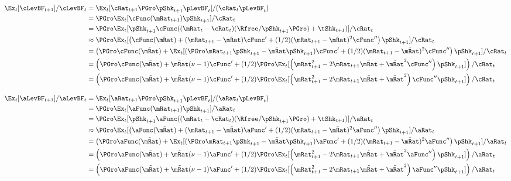 \documentclass[\econtexRoot/BufferStockTheory]{subfiles}
\begin{document}
  
\begin{align*}
\Ex_{t}[\cLevBF_{t+1}]/\cLevBF_{t} 
 & = \Ex_{t}[\cRat_{t+1}\PGro\pShk_{t+1}\pLevBF_{t}]/(\cRat_{t}\pLevBF_{t})
\\ & = \PGro\Ex_{t}[\cFunc(\mRat_{t+1})\pShk_{t+1}]/\cRat_{t}
\\ & = \PGro\Ex_{t}[\pShk_{t+1}\cFunc((\mRat_{t}-\cRat_{t})(\Rfree/\pShk_{t+1}\PGro)+\tShk_{t+1})]/\cRat_{t}
\\ & \approx \PGro\Ex_{t}[\left(\cFunc(\tilde{\mRat})+(\mRat_{t+1}-\tilde{\mRat})\cFunc^{\prime}+(1/2)(\mRat_{t+1}-\tilde{\mRat})^{2}\cFunc^{\prime\prime}\right)\pShk_{t+1}]/\cRat_{t}
\\ & = \left(\PGro \cFunc(\tilde{\mRat})+\Ex_{t}[(\PGro \mRat_{t+1}\pShk_{t+1}-\tilde{\mRat}\pShk_{t+1})\cFunc^{\prime}+(1/2)(\mRat_{t+1}-\tilde{\mRat})^{2}\cFunc^{\prime\prime}\right)\pShk_{t+1}]/\cRat_{t}
  \\ & = \left(\PGro \cFunc(\tilde{\mRat})+\tilde{\mRat}(\nu-1)\cFunc^{\prime}+(1/2)\PGro\Ex_{t}[\left(\mRat_{t+1}^{2}-2\mRat_{t+1}\tilde{\mRat}+\tilde{\mRat}^{2}\cFunc^{\prime\prime}\right)\pShk_{t+1}]\right)/\cRat_{t}
\\ & = \left(\PGro \cFunc(\tilde{\mRat})+\tilde{\mRat}(\nu-1)\cFunc^{\prime}+(1/2)\PGro\Ex_{t}[\left(\mRat_{t+1}^{2}-2\mRat_{t+1}\tilde{\mRat}+\tilde{\mRat}^{2}\right)\cFunc^{\prime\prime}\pShk_{t+1}]\right)/\cRat_{t}       
  \end{align*}
  
\begin{align*}
\Ex_{t}[\aLevBF_{t+1}]/\aLevBF_{t} 
 & = \Ex_{t}[\aRat_{t+1}\PGro\pShk_{t+1}\pLevBF_{t}]/(\aRat_{t}\pLevBF_{t})
\\ & = \PGro\Ex_{t}[\aFunc(\mRat_{t+1})\pShk_{t+1}]/\aRat_{t}
\\ & = \PGro\Ex_{t}[\pShk_{t+1}\aFunc((\mRat_{t}-\cRat_{t})(\Rfree/\pShk_{t+1}\PGro)+\tShk_{t+1})]/\aRat_{t}
\\ & \approx \PGro\Ex_{t}[\left(\aFunc(\tilde{\mRat})+(\mRat_{t+1}-\tilde{\mRat})\aFunc^{\prime}+(1/2)(\mRat_{t+1}-\tilde{\mRat})^{2}\aFunc^{\prime\prime}\right)\pShk_{t+1}]/\aRat_{t}
\\ & = \left(\PGro \aFunc(\tilde{\mRat})+\Ex_{t}[(\PGro \mRat_{t+1}\pShk_{t+1}-\tilde{\mRat}\pShk_{t+1})\aFunc^{\prime}+(1/2)(\mRat_{t+1}-\tilde{\mRat})^{2}\aFunc^{\prime\prime}\right)\pShk_{t+1}]/\aRat_{t}
  \\ & = \left(\PGro \aFunc(\tilde{\mRat})+\tilde{\mRat}(\nu-1)\aFunc^{\prime}+(1/2)\PGro\Ex_{t}[\left(\mRat_{t+1}^{2}-2\mRat_{t+1}\tilde{\mRat}+\tilde{\mRat}^{2}\aFunc^{\prime\prime}\right)\pShk_{t+1}]\right)/\aRat_{t}
\\ & = \left(\PGro \aFunc(\tilde{\mRat})+\tilde{\mRat}(\nu-1)\aFunc^{\prime}+(1/2)\PGro\Ex_{t}[\left(\mRat_{t+1}^{2}-2\mRat_{t+1}\tilde{\mRat}+\tilde{\mRat}^{2}\right)\aFunc^{\prime\prime}\pShk_{t+1}]\right)/\aRat_{t}       
  \end{align*}
  
\end{document}
